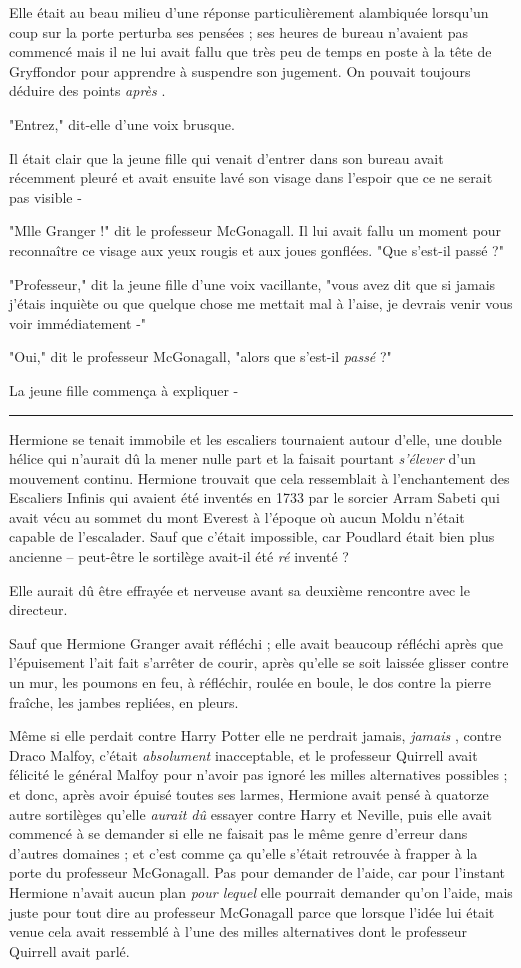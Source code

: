 Elle était au beau milieu d'une réponse particulièrement alambiquée lorsqu'un coup sur la porte perturba ses pensées ; ses heures de bureau n'avaient pas commencé mais il ne lui avait fallu que très peu de temps en poste à la tête de Gryffondor pour apprendre à suspendre son jugement. On pouvait toujours déduire des points \emph{après} .

"Entrez," dit-elle d'une voix brusque.

Il était clair que la jeune fille qui venait d'entrer dans son bureau avait récemment pleuré et avait ensuite lavé son visage dans l'espoir que ce ne serait pas visible -

"Mlle Granger !" dit le professeur McGonagall. Il lui avait fallu un moment pour reconnaître ce visage aux yeux rougis et aux joues gonflées. "Que s'est-il passé ?"

"Professeur," dit la jeune fille d'une voix vacillante, "vous avez dit que si jamais j'étais inquiète ou que quelque chose me mettait mal à l'aise, je devrais venir vous voir immédiatement -"

"Oui," dit le professeur McGonagall, "alors que s'est-il \emph{passé } ?"

La jeune fille commença à expliquer -
\par\noindent\rule{\textwidth}{0.4pt}
Hermione se tenait immobile et les escaliers tournaient autour d'elle, une double hélice qui n'aurait dû la mener nulle part et la faisait pourtant \emph{s'élever}  d'un mouvement continu. Hermione trouvait que cela ressemblait à l'enchantement des Escaliers Infinis qui avaient été inventés en 1733 par le sorcier Arram Sabeti qui avait vécu au sommet du mont Everest à l'époque où aucun Moldu n'était capable de l'escalader. Sauf que c'était impossible, car Poudlard était bien plus ancienne – peut-être le sortilège avait-il été \emph{ré} inventé ?

Elle aurait dû être effrayée et nerveuse avant sa deuxième rencontre avec le directeur.

Sauf que Hermione Granger avait réfléchi ; elle avait beaucoup réfléchi après que l'épuisement l'ait fait s'arrêter de courir, après qu'elle se soit laissée glisser contre un mur, les poumons en feu, à réfléchir, roulée en boule, le dos contre la pierre fraîche, les jambes repliées, en pleurs.

Même si elle perdait contre Harry Potter elle ne perdrait jamais, \emph{jamais} , contre Draco Malfoy, c'était \emph{absolument } inacceptable, et le professeur Quirrell avait félicité le général Malfoy pour n'avoir pas ignoré les milles alternatives possibles ; et donc, après avoir épuisé toutes ses larmes, Hermione avait pensé à quatorze autre sortilèges qu'elle \emph{aurait dû}  essayer contre Harry et Neville, puis elle avait commencé à se demander si elle ne faisait pas le même genre d'erreur dans d'autres domaines ; et c'est comme ça qu'elle s'était retrouvée à frapper à la porte du professeur McGonagall. Pas pour demander de l'aide, car pour l'instant Hermione n'avait aucun plan \emph{pour lequel}  elle pourrait demander qu'on l'aide, mais juste pour tout dire au professeur McGonagall parce que lorsque l'idée lui était venue cela avait ressemblé à l'une des milles alternatives dont le professeur Quirrell avait parlé.

